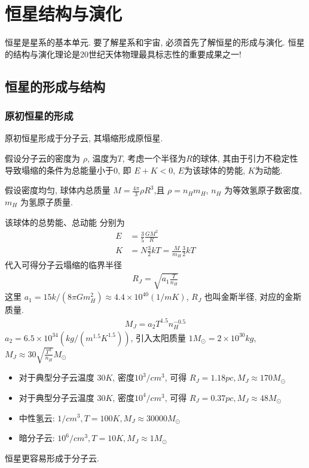 \newpage
\section{恒星结构与演化}
恒星是星系的基本单元. 要了解星系和宇宙, 必须首先了解恒星的形成与演化. 恒星的结构与演化理论是20世纪天体物理最具标志性的重要成果之一! 
\subsection{恒星的形成与结构}

\subsubsection{原初恒星的形成}
原初恒星形成于分子云, 其塌缩形成原恒星. 

假设分子云的密度为 $\rho$, 温度为$T$, 考虑一个半径为$R$的球体, 其由于引力不稳定性导致塌缩的条件为总能量小于0, 即 $E+K<0$, $E$为该球体的势能, $K$为动能. 

假设密度均匀, 球体内总质量 $M=\frac{4\pi}{3}\rho R^3$,且 $\rho=n_H m_H$, $n_H$ 为等效氢原子数密度, $m_H$ 为氢原子质量. 

该球体的总势能、总动能 分别为
\begin{align*}
    E&=\frac{3}{5}\frac{GM^2}{R}\\
    K&=N\frac{3}{2}kT=\frac{M}{m_H}\frac{3}{2}kT
\end{align*}
代入可得分子云塌缩的临界半径
\begin{align*}
    R_J=\sqrt{a_1\frac{T}{n_H}}
\end{align*}
这里 $a_1=15k/(8\pi G m_H^2) \approx 4.4 \times 10^{40}(1/mK)$, $R_J$ 也叫金斯半径, 对应的金斯质量. 
\begin{align*}
    M_J=a_2T^{1.5}n_H^{-0.5}
\end{align*}
$a_2=6.5\times 10^{34}(kg/(m^{1.5}K^{1.5}))$, 引入太阳质量 $1M_{\odot}=2\times 10^{30}kg$, $M_J\approx 30\sqrt{\frac{T^3}{n_H}}M_{\odot }$ 

\begin{itemize}
    \item 对于典型分子云温度 $30K$, 密度$10^3/cm^3$, 可得 $R_J=1.18 pc, M_J\approx 170 M_{\odot}$
    \item 对于典型分子云温度 $30K$, 密度$10^4/cm^3$, 可得 $R_J=0.37 pc, M_J\approx 48 M_{\odot} $
    \item 中性氢云: $1/cm^3, T=100K, M_J \approx 30000 M_{\odot}$
    \item 暗分子云: $10^6/cm^3, T=10K, M_J \approx 1 M_{\odot}$
\end{itemize}
恒星更容易形成于分子云. 


